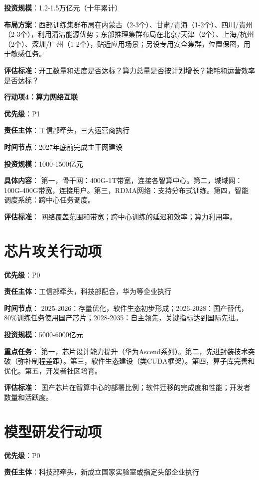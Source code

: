 \textbf{投资规模}：1.2-1.5万亿元（十年累计）

\textbf{布局方案}：西部训练集群布局在内蒙古（2-3个）、甘肃/青海（1-2个）、四川/贵州（2-3个），利用清洁能源优势；东部推理集群布局在北京/天津（2个）、上海/杭州（2个）、深圳/广州（1-2个），贴近应用场景；另设专用安全集群，位置保密，用于敏感任务。

\textbf{评估标准}：开工数量和进度是否达标？算力总量是否按计划增长？能耗和运营效率是否达标？

\textbf{行动项4：算力网络互联}

\textbf{优先级}：P1

\textbf{责任主体}：工信部牵头，三大运营商执行

\textbf{时间节点}：2027年底前完成主干网建设

\textbf{投资规模}：1000-1500亿元

\textbf{具体内容}：
第一，骨干网：400G-1T带宽，连接各智算中心。第二，城域网：100G-400G带宽，连接用户。第三，RDMA网络：支持分布式训练。第四，智能调度系统：跨中心任务调度。

\textbf{评估标准}：
网络覆盖范围和带宽；跨中心训练的延迟和效率；算力利用率。

\section{芯片攻关行动项}

\textbf{优先级}：P0

\textbf{责任主体}：工信部牵头，科技部配合，华为等企业执行

\textbf{时间节点}：
2025-2026：存量优化，软件生态初步形成；2026-2028：国产替代，80\%训练任务使用国产芯片；2028-2035：自主领先，关键指标达到国际先进。

\textbf{投资规模}：5000-6000亿元

\textbf{重点任务}：
第一，芯片设计能力提升（华为Ascend系列）。第二，先进封装技术突破（弥补制程差距）。第三，软件生态建设（类CUDA框架）。第四，算子库完善和优化。第五，开发者社区培育。

\textbf{评估标准}：
国产芯片在智算中心的部署比例；软件迁移的完成度和性能；开发者数量和活跃度。

\section{模型研发行动项}

\textbf{优先级}：P0

\textbf{责任主体}：科技部牵头，新成立国家实验室或指定头部企业执行

